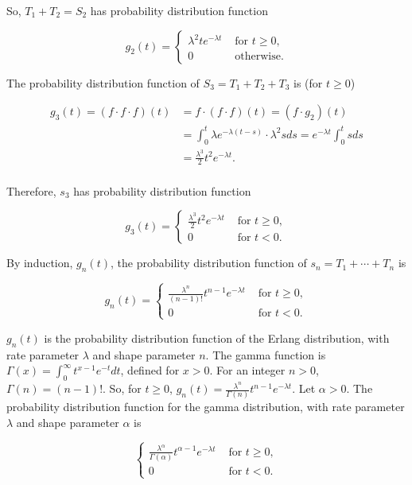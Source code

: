\documentclass[12pt]{article}
\begin{document}
So, $T_1 + T_2 = S_2$ has probability distribution function 

\[ g_2(t) =  \begin{cases} 
      \lambda^2 t e^{- \lambda t} & \text{ for } t \geq 0, \\
      0 & \text{ otherwise}.
      \end{cases} \]

\noindent
The probability distribution function of $S_3 = T_1 + T_2 + T_3$ is (for $t \geq 0$)

\begin{align*}
g_3(t) = (f \cdot f \cdot f)(t) &= f \cdot (f \cdot f) (t) = (f \cdot g_2) (t) \\
&= \int_{0}^{t} \lambda e^{- \lambda (t-s)} \cdot \lambda^2 s ds = e^{- \lambda t} \int_{0}^{t} s ds \\
&= \frac{\lambda^3}{2} t^2 e^{- \lambda t}. \\
\end{align*}

\noindent
Therefore, $s_3$ has probability distribution function 

\[ g_3(t) =  \begin{cases} 
      \frac{\lambda^3}{2} t^2 e^{- \lambda t} & \text{ for } t \geq 0, \\
      0 & \text{ for } t < 0.
      \end{cases} \]
      
\noindent
By induction, $g_n(t)$, the probability distribution function of $s_n = T_1 + \cdots + T_n$ is 

\[ g_n(t) =  \begin{cases} 
      \frac{\lambda^n}{(n-1)!} t^{n-1} e^{- \lambda t} & \text{ for } t \geq 0, \\
      0 & \text{ for } t < 0.
      \end{cases} \]
      
\noindent
$g_n(t)$ is the probability distribution function of the Erlang distribution, with rate parameter $\lambda$ and shape parameter $n$. The gamma function is $\Gamma (x) = \int_{0}^{\infty} t^{x-1} e^{-t} dt$, defined for $x > 0$. For an integer $n > 0$, $\Gamma (n) = (n-1)!$. So, for $t \geq 0$, $g_n(t) = \frac{\lambda^n}{\Gamma(n)} t^{n-1} e^{- \lambda t}$. Let $\alpha > 0$. The probability distribution function for the gamma distribution, with rate parameter $\lambda$ and shape parameter $\alpha$ is 

\[ \begin{cases} 
      \frac{\lambda^{\alpha}}{\Gamma(\alpha)} t^{\alpha -1} e^{- \lambda t} & \text{ for } t \geq 0, \\
      0 & \text{ for } t < 0.
      \end{cases} \]
      
\end{document}
